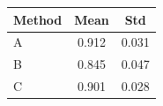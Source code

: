 \begin{table}[htbp]
\centering
\begin{tabular}{lSS}
\toprule
Method & {Mean} & {Std} \\
\midrule
A & 0.912 & 0.031 \\
B & 0.845 & 0.047 \\
C & 0.901 & 0.028 \\
\bottomrule
\end{tabular}
\end{table}
